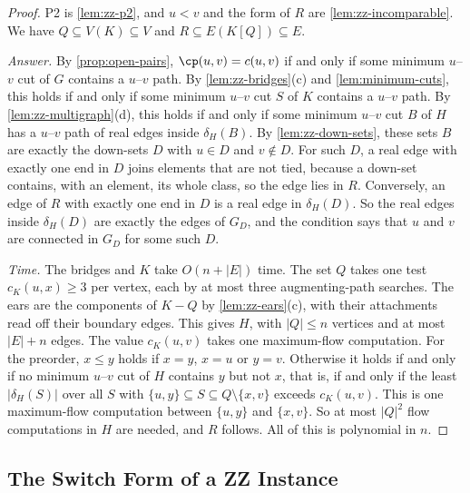 \begin{proof}
P2 is \cref{lem:zz-p2}, and $u < v$ and the form of $R$ are \cref{lem:zz-incomparable}.
We have $Q \subseteq V(K) \subseteq V$ and $R \subseteq E(K[Q]) \subseteq E$.

\emph{Answer.}
By \cref{prop:open-pairs}, $\cp(u, v) = c(u, v)$ if and only if some minimum $u$--$v$ cut of $G$ contains a $u$--$v$ path.
By \cref{lem:zz-bridges}(c) and \cref{lem:minimum-cuts}, this holds if and only if some minimum $u$--$v$ cut $S$ of $K$ contains a $u$--$v$ path.
By \cref{lem:zz-multigraph}(d), this holds if and only if some minimum $u$--$v$ cut $B$ of $H$ has a $u$--$v$ path of real edges inside $\delta_H(B)$.
By \cref{lem:zz-down-sets}, these sets $B$ are exactly the down-sets $D$ with $u \in D$ and $v \notin D$.
For such $D$, a real edge with exactly one end in $D$ joins elements that are not tied, because a down-set contains, with an element, its whole class, so the edge lies in $R$.
Conversely, an edge of $R$ with exactly one end in $D$ is a real edge in $\delta_H(D)$.
So the real edges inside $\delta_H(D)$ are exactly the edges of $G_D$, and the condition says that $u$ and $v$ are connected in $G_D$ for some such $D$.

\emph{Time.}
The bridges and $K$ take $O(n + |E|)$ time.
The set $Q$ takes one test $c_K(u, x) \geq 3$ per vertex, each by at most three augmenting-path searches.
The ears are the components of $K - Q$ by \cref{lem:zz-ears}(c), with their attachments read off their boundary edges.
This gives $H$, with $|Q| \leq n$ vertices and at most $|E| + n$ edges.
The value $c_K(u, v)$ takes one maximum-flow computation.
For the preorder, $x \leq y$ holds if $x = y$, $x = u$ or $y = v$.
Otherwise it holds if and only if no minimum $u$--$v$ cut of $H$ contains $y$ but not $x$, that is, if and only if the least $|\delta_H(S)|$ over all $S$ with $\{u, y\} \subseteq S \subseteq Q \setminus \{x, v\}$ exceeds $c_K(u, v)$.
This is one maximum-flow computation between $\{u, y\}$ and $\{x, v\}$.
So at most $|Q|^2$ flow computations in $H$ are needed, and $R$ follows.
All of this is polynomial in $n$.
\end{proof}

\subsection{The Switch Form of a ZZ Instance}
\label{sec:zz-construction}

